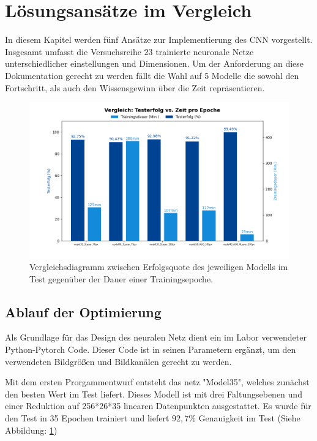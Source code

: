 \documentclass[journal,twoside,web]{ieeecolor}
\begin{document}
\section{Lösungsansätze im Vergleich}
In diesem Kapitel werden fünf Ansätze zur Implementierung des CNN vorgestellt. Insgesamt umfasst die Versuchsreihe 23 trainierte neuronale Netze unterschiedlicher einstellungen und Dimensionen.
Um der Anforderung an diese Dokumentation gerecht zu werden fällt die Wahl auf 5 Modelle die sowohl den Fortschritt, als auch den Wissensgewinn über die Zeit repräsentieren.

\begin{figure}[H]
    \centerline{\includegraphics[width=\columnwidth]{Erfolg_Dauer.png}}
    \caption{Vergleichsdiagramm zwischen Erfolgsquote des jeweiligen Modells im Test gegenüber der Dauer einer Trainingsepoche.}
    \label{fig:compareGraph}
\end{figure}

\subsection{Ablauf der Optimierung}
\label{sec:optimization}
Als Grundlage für das Design des neuralen Netz dient ein im Labor verwendeter Python-Pytorch Code. Dieser Code ist in seinen Parametern ergänzt, um den verwendeten Bildgrößen und Bildkanälen gerecht zu werden. 

Mit dem ersten Prorgammentwurf entsteht das netz "Model35", welches zunächst den besten Wert im Test liefert. Dieses Modell ist mit drei Faltungsebenen und einer Reduktion auf 256*26*35 linearen Datenpunkten ausgestattet.
Es wurde für den Test in 35 Epochen trainiert und liefert $92,7\%$ Genauigkeit im Test (Siehe Abbildung: \ref{fig:compareGraph})
\end{document}

